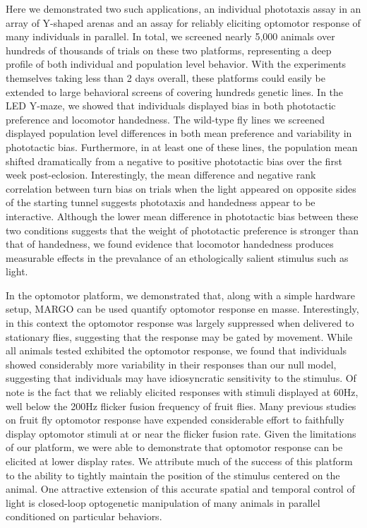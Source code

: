 \documentclass[10pt]{article}
\begin{document}
\begin{multicols}{2}
Here we demonstrated two such applications, an individual phototaxis assay in an array of Y-shaped arenas and an assay for reliably eliciting optomotor response of many individuals in parallel. In total, we screened nearly 5,000 animals over hundreds of thousands of trials on these two platforms, representing a deep profile of both individual and population level behavior. With the experiments themselves taking less than 2 days overall, these platforms could easily be extended to large behavioral screens of covering hundreds genetic lines. In the LED Y-maze, we showed that individuals displayed bias in both phototactic preference and locomotor handedness. The wild-type fly lines we screened displayed population level differences in both mean preference and variability in phototactic bias. Furthermore, in at least one of these lines, the population mean shifted dramatically from a negative to positive phototactic bias over the first week post-eclosion. Interestingly, the mean difference and negative rank correlation between turn bias on trials when the light appeared on opposite sides of the starting tunnel suggests phototaxis and handedness appear to be interactive. Although the lower mean difference in phototactic bias between these two conditions suggests that the weight of phototactic preference is stronger than that of handedness, we found evidence that locomotor handedness produces measurable effects in the prevalance of an ethologically salient stimulus such as light. 

In the optomotor platform, we demonstrated that, along with a simple hardware setup, MARGO can be used quantify optomotor response en masse. Interestingly, in this context the optomotor response was largely suppressed when delivered to stationary flies, suggesting that the response may be gated by movement. While all animals tested exhibited the optomotor response, we found that individuals showed considerably more variability in their responses than our null model, suggesting that individuals may have idiosyncratic sensitivity to the stimulus. Of note is the fact that we reliably elicited responses with stimuli displayed at 60Hz, well below the 200Hz flicker fusion frequency of fruit flies. Many previous studies on fruit fly optomotor response have expended considerable effort to faithfully display optomotor stimuli at or near the flicker fusion rate. Given the limitations of our platform, we were able to demonstrate that optomotor response can be elicited at lower display rates. We attribute much of the success of this platform to the ability to tightly maintain the position of the stimulus centered on the animal. One attractive extension of this accurate spatial and temporal control of light is closed-loop optogenetic manipulation of many animals in parallel conditioned on particular behaviors. 


\end{multicols}
\end{document}
